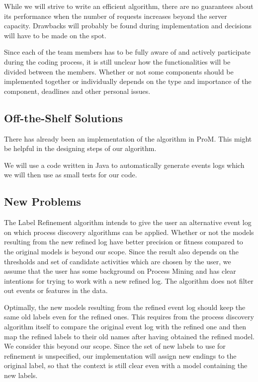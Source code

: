 \documentclass[notitlepage]{article}
\begin{document}
\begin{flushleft}
While we will strive to write an efficient algorithm, there are no guarantees about its  performance when the number of requests increases beyond the server capacity. Drawbacks will probably be found during implementation and decisions will have to be made on the spot.

Since each of the team members has to be fully aware of and actively participate during the coding process, it is still unclear how the functionalities will be divided between the members.
Whether or not some components should be implemented together or individually depends on the type and importance of the component, deadlines and other personal issues.


\subsection{Off-the-Shelf Solutions}
There has already been an implementation of the algorithm in ProM.
This might be helpful in the designing steps of our algorithm.

We will use a code written in Java to automatically generate events logs which we will then use as small tests for our code.


\subsection{New Problems}
The Label Refinement algorithm intends to give the user an alternative event log on which process discovery algorithms can be applied.
Whether or not the models resulting from the new refined log have better precision or fitness compared to the original models is beyond our scope.
Since the result also depends on the thresholds and set of candidate activities which are chosen by the user, we assume that the user has some background on Process Mining and has clear intentions for trying to work with a new refined log.
The algorithm does not filter out events or features in the data.

Optimally, the new models resulting from the refined event log should keep the same old labels even for the refined ones.
This requires from the process discovery algorithm itself to compare the original event log with the refined one and then map the refined labels to their old names after having obtained the refined model.
We consider this beyond our scope.
Since the set of new labels to use for refinement is unspecified, our implementation will assign new endings to the original label, so that the context is still clear even with a model containing the new labels.


\end{flushleft}
\end{document}
